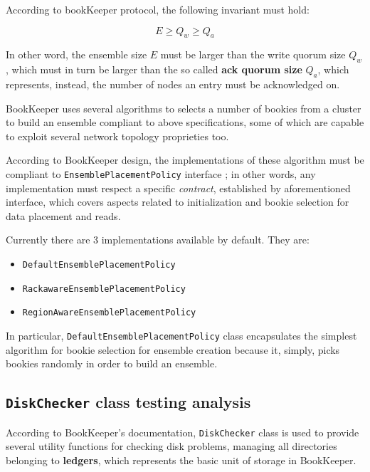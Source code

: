 \documentclass[sigconf]{acmart}
\begin{document}
According to bookKeeper protocol\cite{BookKeeperProtocol}, the following invariant must hold:

\begin{equation}
E \geqslant Q_w \geqslant Q_a
\end{equation}

In other word, the ensemble size $E$ must be larger than the write quorum size $Q_w$, which must in turn be larger than the so called \textbf{ack quorum size} $Q_a$, which represents, instead, the number of nodes an entry must be acknowledged on. 

BookKeeper uses several algorithms to selects a number of bookies from a cluster to build an ensemble compliant to above specifications, some of which are capable to exploit several network topology proprieties too. 

According to BookKeeper design, the implementations of these algorithm must be compliant to \texttt{EnsemblePlacementPolicy} interface \cite{EnsemblePlacementPolicy}; in other words, any implementation must respect a specific \textit{contract}, established by aforementioned interface, which covers aspects related to initialization and bookie selection for data placement and reads\cite{EnsemblePlacementPolicy}. 

Currently there are 3 implementations available by default. They are:
\begin{itemize}
\item \texttt{DefaultEnsemblePlacementPolicy}
\item \texttt{RackawareEnsemblePlacementPolicy}
\item \texttt{RegionAwareEnsemblePlacementPolicy}
\end{itemize}

In particular, \texttt{DefaultEnsemblePlacementPolicy} class encapsulates the simplest algorithm for bookie selection for ensemble creation because it, simply, picks bookies randomly in order to build an ensemble. 

\subsection{\texttt{DiskChecker} class testing analysis}

According to BookKeeper's documentation, \texttt{DiskChecker} class is used to provide several utility functions for checking disk problems, managing all directories belonging to \textbf{ledgers}, which represents the basic unit of storage in BookKeeper\cite{BookKeeperArchitecture}. 
\end{document}
